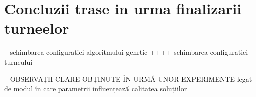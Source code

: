 \section {Concluzii trase in urma finalizarii turneelor}

-- schimbarea configuratiei algoritmului genrtic ++++ schimbarea configuratiei turneului

-- OBSERVAȚII CLARE OBȚINUTE ÎN URMĂ UNOR EXPERIMENTE legat de modul în care parametrii influențează calitatea soluțiilor